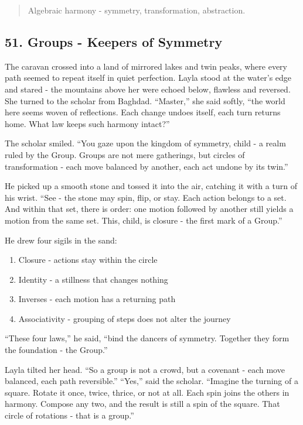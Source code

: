 \documentclass[
  letterpaper,
  DIV=11,
  numbers=noendperiod]{scrreprt}
\providecommand{\tightlist}{%
  \setlength{\itemsep}{0pt}\setlength{\parskip}{0pt}}
\begin{document}
\begin{quote}
Algebraic harmony - symmetry, transformation, abstraction.
\end{quote}

\subsection{51. Groups - Keepers of
Symmetry}\label{groups---keepers-of-symmetry}

The caravan crossed into a land of mirrored lakes and twin peaks, where
every path seemed to repeat itself in quiet perfection. Layla stood at
the water's edge and stared - the mountains above her were echoed below,
flawless and reversed. She turned to the scholar from Baghdad.
``Master,'' she said softly, ``the world here seems woven of
reflections. Each change undoes itself, each turn returns home. What law
keeps such harmony intact?''

The scholar smiled. ``You gaze upon the kingdom of symmetry, child - a
realm ruled by the Group. Groups are not mere gatherings, but circles of
transformation - each move balanced by another, each act undone by its
twin.''

He picked up a smooth stone and tossed it into the air, catching it with
a turn of his wrist. ``See - the stone may spin, flip, or stay. Each
action belongs to a set. And within that set, there is order: one motion
followed by another still yields a motion from the same set. This,
child, is closure - the first mark of a Group.''

He drew four sigils in the sand:

\begin{enumerate}
\def\labelenumi{\arabic{enumi}.}
\tightlist
\item
  Closure - actions stay within the circle
\item
  Identity - a stillness that changes nothing
\item
  Inverses - each motion has a returning path
\item
  Associativity - grouping of steps does not alter the journey
\end{enumerate}

``These four laws,'' he said, ``bind the dancers of symmetry. Together
they form the foundation - the Group.''

Layla tilted her head. ``So a group is not a crowd, but a covenant -
each move balanced, each path reversible.'' ``Yes,'' said the scholar.
``Imagine the turning of a square. Rotate it once, twice, thrice, or not
at all. Each spin joins the others in harmony. Compose any two, and the
result is still a spin of the square. That circle of rotations - that is
a group.''
\end{document}

